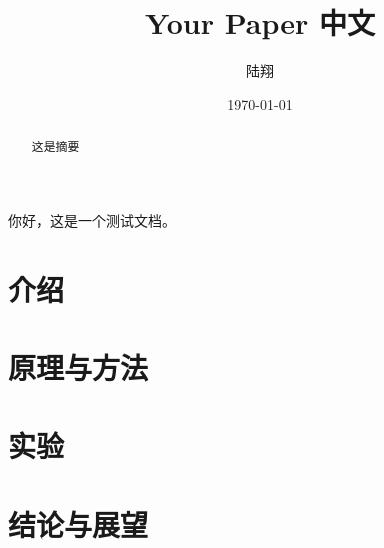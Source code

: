 \documentclass{article}
\title{Your Paper 中文}
\author{陆翔}
\date{\today}
\begin{document}
\maketitle
你好，这是一个测试文档。
\begin{abstract}
    这是摘要
\end{abstract}

\section{介绍}

\section{原理与方法}


\section{实验}

\section{结论与展望}
\end{document}
